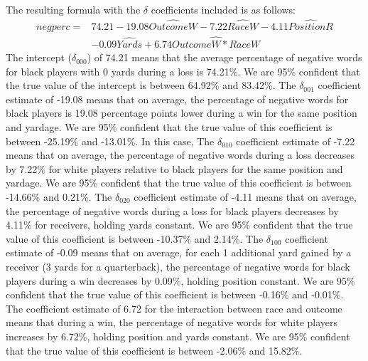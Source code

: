 \documentclass[12pt,twoside]{reedthesis}
\begin{document}
The resulting formula with the \(\delta\) coefficients included is as
follows:
\begin{align*}
{negperc} = &74.21 - 19.08\widehat{OutcomeW} - 7.22\widehat{RaceW} - 4.11\widehat{PositionR}\\
& - 0.09\widehat{Yards} + 6.74\widehat{OutcomeW*RaceW}
\end{align*}
The intercept (\(\delta_{000}\)) of 74.21 means that the average
percentage of negative words for black players with 0 yards during a
loss is 74.21\%. We are 95\% confident that the true value of the
intercept is between 64.92\% and 83.42\%. The \(\delta_{001}\)
coefficient estimate of -19.08 means that on average, the percentage of
negative words for black players is 19.08 percentage points lower during
a win for the same position and yardage. We are 95\% confident that the
true value of this coefficient is between -25.19\% and -13.01\%. In this
case, The \(\delta_{010}\) coefficient estimate of -7.22 means that on
average, the percentage of negative words during a loss decreases by
7.22\% for white players relative to black players for the same position
and yardage. We are 95\% confident that the true value of this
coefficient is between -14.66\% and 0.21\%. The \(\delta_{020}\)
coefficient estimate of -4.11 means that on average, the percentage of
negative words during a loss for black players decreases by 4.11\% for
receivers, holding yards constant. We are 95\% confident that the true
value of this coefficient is between -10.37\% and 2.14\%. The
\(\delta_{100}\) coefficient estimate of -0.09 means that on average,
for each 1 additional yard gained by a receiver (3 yards for a
quarterback), the percentage of negative words for black players during
a win decreases by 0.09\%, holding position constant. We are 95\%
confident that the true value of this coefficient is between -0.16\% and
-0.01\%. The coefficient estimate of 6.72 for the interaction between
race and outcome means that during a win, the percentage of negative
words for white players increases by 6.72\%, holding position and yards
constant. We are 95\% confident that the true value of this coefficient
is between -2.06\% and 15.82\%.
\end{document}
